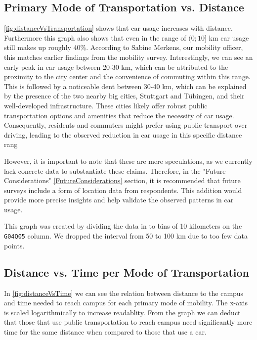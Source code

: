 \subsection{Primary Mode of Transportation vs. Distance}

\ref{fig:distanceVsTransportation} shows that car usage increases with distance. Furthermore this graph also shows that even in the range of $(0;10]$ km car usage still makes up roughly 40\%. According to Sabine Merkens, our mobility officer, this matches earlier findings from the mobility survey. 
Interestingly, we can see an early peak in car usage between 20-30 km, which can be attributed to the proximity to the city center and the convenience of commuting within this range. This is followed by a noticeable dent between 30-40 km, which can be explained by the presence of the two nearby big cities, Stuttgart and Tübingen, and their well-developed infrastructure. These cities likely offer robust public transportation options and amenities that reduce the necessity of car usage. Consequently, residents and commuters might prefer using public transport over driving, leading to the observed reduction in car usage in this specific distance rang

However, it is important to note that these are mere speculations, as we currently lack concrete data to substantiate these claims. Therefore, in the "Future Considerations" \ref{FutureConsiderations} section, it is recommended that future surveys include a form of location data from respondents. This addition would provide more precise insights and help validate the observed patterns in car usage.

This graph was created by dividing the data in to bins of 10 kilometers on the \texttt{G04Q05} column. We dropped the interval from 50 to 100 km due to too few data points.

\subsection{Distance vs. Time per Mode of Transportation}

In \ref{fig:distanceVsTime} we can see the relation between distance to the campus and time needed to reach campus for each primary mode of mobility. The x-axis is scaled logarithmically to increase readablity. From the graph we can deduct that those that use public transportation to reach campus need significantly more time for the same distance when compared to those that use a car.

